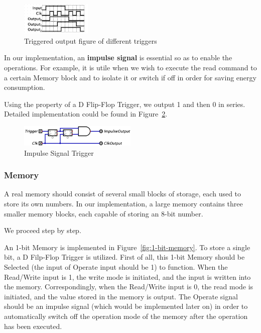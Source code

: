 \documentclass[conference]{IEEEtran}
\begin{document}
\begin{figure}[h!]
    \centering
    \includegraphics[width=0.3\textwidth]{assets/trigger-output.png}
    \caption{Triggered output figure of different triggers}
    \label{fig:trigger-output}
\end{figure}

In our implementation, an \textbf{impulse signal} is essential so as to enable the operations. For example, it is utile when we wish to execute the read command to a certain Memory block and to isolate it or switch if off in order for saving energy consumption.

Using the property of a D Flip-Flop Trigger, we output 1 and then 0 in series. Detailed implementation could be found in Figure~\ref{fig:impulse-output}.

\begin{figure}[h!]
    \centering
    \includegraphics[width=0.5\textwidth]{assets/impulse-output.png}
    \caption{Impulse Signal Trigger}
    \label{fig:impulse-output}
\end{figure}


\subsubsection{Memory}



A real memory should consist of several small blocks of storage, each used to store its own numbers. In our implementation, a large memory contains three smaller memory blocks, each capable of storing an 8-bit number.

We proceed step by step.

An 1-bit Memory is implemented in Figure~\ref{fig:1-bit-memory}. To store a single bit, a D Filp-Flop Trigger is utilized. First of all, this 1-bit Memory should be Selected (the input of Operate input should be 1) to function.
When the Read/Write input is 1, the write mode is initiated, and the input is written into the memory. Correspondingly, when the Read/Write input is 0, the read mode is initiated, and the value stored in the memory is output.
The Operate signal should be an impulse signal (which would be implemented later on) in order to automatically switch off the operation mode of the memory after the operation has been executed.
\end{document}
